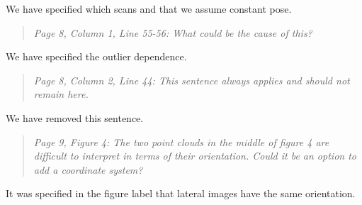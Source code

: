 \documentclass{article}
\newenvironment{itquote}
  {\begin{quote}\itshape}
  {\end{quote}\ignorespacesafterend}
\begin{document}
We have specified which scans and that we assume constant pose.

\begin{itquote}
Page 8, Column 1, Line 55-56: What could be the cause of this?
\end{itquote}

We have specified the outlier dependence.

\begin{itquote}
Page 8, Column 2, Line 44: This sentence always applies and should
not remain here.
\end{itquote}

We have removed this sentence.

\begin{itquote}
Page 9, Figure 4: The two point clouds in the middle of figure 4 are
difficult to interpret in terms of their orientation. Could it be an
option to add a coordinate system?
\end{itquote}

It was specified in the figure label that lateral images have the same
orientation.
\end{document}
